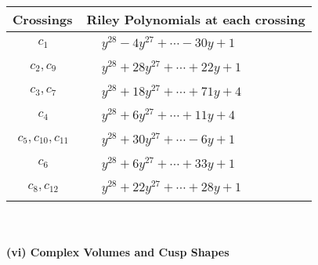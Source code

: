 \documentclass[1p]{elsarticle_modified}
\theoremstyle{definition}
\begin{document}
\begin{tabular}{m{50pt}|m{274pt}}
Crossings & \hspace{64pt}Riley Polynomials at each crossing \\
\hline $$\begin{aligned}c_{1}\end{aligned}$$&$\begin{aligned}
&y^{28}-4 y^{27}+\cdots-30 y+1
\end{aligned}$\\
\hline $$\begin{aligned}c_{2},c_{9}\end{aligned}$$&$\begin{aligned}
&y^{28}+28 y^{27}+\cdots+22 y+1
\end{aligned}$\\
\hline $$\begin{aligned}c_{3},c_{7}\end{aligned}$$&$\begin{aligned}
&y^{28}+18 y^{27}+\cdots+71 y+4
\end{aligned}$\\
\hline $$\begin{aligned}c_{4}\end{aligned}$$&$\begin{aligned}
&y^{28}+6 y^{27}+\cdots+11 y+4
\end{aligned}$\\
\hline $$\begin{aligned}c_{5},c_{10},c_{11}\end{aligned}$$&$\begin{aligned}
&y^{28}+30 y^{27}+\cdots-6 y+1
\end{aligned}$\\
\hline $$\begin{aligned}c_{6}\end{aligned}$$&$\begin{aligned}
&y^{28}+6 y^{27}+\cdots+33 y+1
\end{aligned}$\\
\hline $$\begin{aligned}c_{8},c_{12}\end{aligned}$$&$\begin{aligned}
&y^{28}+22 y^{27}+\cdots+28 y+1
\end{aligned}$\\
\hline
\end{tabular}\\~\\
\newpage\flushleft \textbf{(vi) Complex Volumes and Cusp Shapes}
\end{document}

